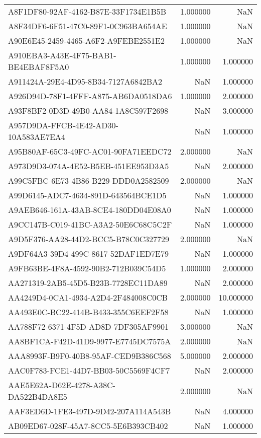 \begin{tabular}{lrr}
A8F1DF80-92AF-4162-B87E-33F1734E1B5B & 1.000000 & NaN \\
A8F34DF6-6F51-47C0-89F1-0C963BA654AE & 1.000000 & NaN \\
A90E6E45-2459-4465-A6F2-A9FEBE2551E2 & 1.000000 & NaN \\
A910EBA3-A43E-4F75-BAB1-BE4EBAF8F5A0 & 1.000000 & 1.000000 \\
A911424A-29E4-4D95-8B34-7127A6842BA2 & NaN & 1.000000 \\
A926D94D-78F1-4FFF-A875-AB6DA0518DA6 & 1.000000 & 2.000000 \\
A93F8BF2-0D3D-49B0-AA84-1A8C597F2698 & NaN & 3.000000 \\
A957D9DA-FFCB-4E42-AD30-10A583AE7EA4 & NaN & 1.000000 \\
A95B80AF-65C3-49FC-AC01-90FA71EEDC72 & 2.000000 & NaN \\
A973D9D3-074A-4E52-B5EB-451EE953D3A5 & NaN & 2.000000 \\
A99C5FBC-6E73-4B86-B229-DDD0A2582509 & 2.000000 & NaN \\
A99D6145-ADC7-4634-891D-643564BCE1D5 & NaN & 1.000000 \\
A9AEB646-161A-43AB-8CE4-180DD04E08A0 & NaN & 1.000000 \\
A9CC147B-C019-41BC-A3A2-50E6C68C5C2F & NaN & 1.000000 \\
A9D5F376-AA28-44D2-BCC5-B78C0C327729 & 2.000000 & NaN \\
A9DF64A3-39D4-499C-8617-52DAF1ED7E79 & NaN & 1.000000 \\
A9FB63BE-4F8A-4592-90B2-712B039C54D5 & 1.000000 & 2.000000 \\
AA271319-2AB5-45D5-B23B-7728EC11DA89 & NaN & 2.000000 \\
AA4249D4-0CA1-4934-A2D4-2F484008C0CB & 2.000000 & 10.000000 \\
AA493E0C-BC22-414B-B433-355C6EEF2F58 & NaN & 1.000000 \\
AA788F72-6371-4F5D-AD8D-7DF305AF9901 & 3.000000 & NaN \\
AA8BF1CA-F42D-41D9-9977-E7745DC7575A & 2.000000 & NaN \\
AAA8993F-B9F0-40B8-95AF-CED9B386C568 & 5.000000 & 2.000000 \\
AAC0F783-FCE1-44D7-BB03-50C5569F4CF7 & NaN & 2.000000 \\
AAE5E62A-D62E-4278-A38C-DA522B4DA8E5 & 2.000000 & NaN \\
AAF3ED6D-1FE3-497D-9D42-207A114A543B & NaN & 4.000000 \\
AB09ED67-028F-45A7-8CC5-5E6B393CB402 & NaN & 1.000000 \\

\end{tabular}
